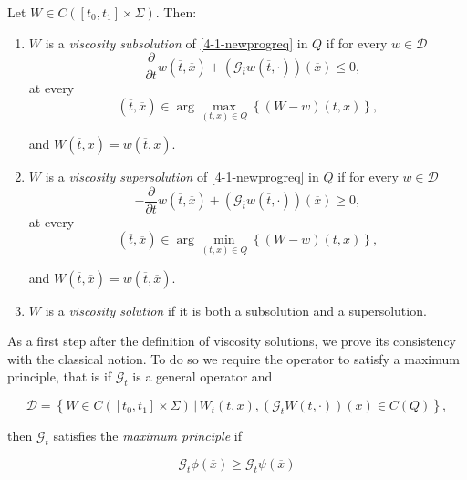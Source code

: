 \begin{definition}\label{4-1-defviscsol}
    Let $W\in C([t_0,t_1]\times\Sigma)$. Then:
    \begin{enumerate}
        \item $W$ is a \textit{viscosity subsolution} of \ref{4-1-newprogreq} in $Q$ if for every $w\in\mathcal{D}$
        \begin{equation}\label{4-1-defsubsolution}
            -\frac{\partial}{\partial t}w\left(\overline{t},\overline{x}\right) + \left(\mathcal{G}_{\overline{t}}w\left(\overline{t},\cdot\right)\right)\left(\overline{x}\right) \leq 0,
        \end{equation} 
        at every
        \[\left(\overline{t},\overline{x}\right)\in \arg \max_{(t,x)\in Q}\left\{(W-w)(t,x)\right\},\]

        and $W\left(\overline{t},\overline{x}\right)=w\left(\overline{t},\overline{x}\right)$.
        \item $W$ is a \textit{viscosity supersolution} of \ref{4-1-newprogreq} in $Q$ if for every $w\in\mathcal{D}$
        \begin{equation}\label{4-1-defsupersolution}
            -\frac{\partial}{\partial t}w\left(\overline{t},\overline{x}\right) + \left(\mathcal{G}_{\overline{t}}w\left(\overline{t},\cdot\right)\right)\left(\overline{x}\right) \geq 0,
        \end{equation} 
        at every
        \[\left(\overline{t},\overline{x}\right)\in \arg \min_{(t,x)\in Q}\left\{(W-w)(t,x)\right\},\]

        and $W\left(\overline{t},\overline{x}\right)=w\left(\overline{t},\overline{x}\right)$.
        \item $W$ is a \textit{viscosity solution} if it is both a subsolution and a supersolution.
    \end{enumerate}
\end{definition}

As a first step after the definition of viscosity solutions, we prove its consistency with the classical notion. To do so we require the 
operator to satisfy a maximum principle, that is if $\mathcal{G}_t$ is a general 
operator and

\[\mathcal{D}=\left\{W\in C([t_0,t_1]\times\Sigma)\,|\,W_t(t,x),(\mathcal{G}_tW(t,\cdot))(x)\in C(Q)\right\},\]

then $\mathcal{G}_t$ satisfies the \textit{maximum principle} if

\[\mathcal{G}_t\phi(\overline{x})\geq\mathcal{G}_t\psi(\overline{x})\]

